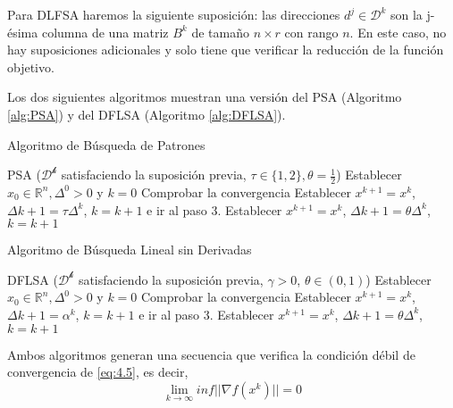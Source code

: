 Para DLFSA haremos la siguiente suposición: las direcciones $d^j\in\mathcal{D}^k$  son la j-ésima columna de una matriz $B^k$ de tamaño $n\times r$ con rango $n$. 
En este caso, no hay suposiciones adicionales y solo tiene que verificar la reducción de la función objetivo. 

Los dos siguientes algoritmos muestran una versión del PSA (Algoritmo \ref{alg:PSA}) y del DFLSA (Algoritmo \ref{alg:DFLSA}).

\begin{algorithm}[H]
\caption{Algoritmo de Búsqueda de Patrones}\label{alg:PSA}
\begin{algorithmic}[1]
\Procedure \textsc{PSA} ($\mathcal{D^k}$ satisfaciendo la suposición previa, $\tau\in\{1,2\}, \theta=\frac{1}{2}$)
\State Establecer $x_0\in\mathbb{R}^n, \Delta^0>0$ y $k=0$
\State Comprobar la convergencia
	\State Establecer $x^{k+1} = x^k$, $\Delta k+1 = \tau\Delta^k$, $k=k+1$ e ir al paso 3.
\Else
	\State Establecer $x^{k+1} = x^k$, $\Delta k+1=\theta\Delta^k$, $k = k+1$ 
\EndIf
\EndProcedure
\end{algorithmic}
\end{algorithm}

\begin{algorithm}[H]
\caption{Algoritmo de Búsqueda Lineal sin Derivadas}\label{alg:DFLSA}
\begin{algorithmic}[1]
\Procedure \textsc{DFLSA} ($\mathcal{D^k}$ satisfaciendo la suposición previa, $\gamma >0$, $\theta\in(0,1)$)
\State Establecer $x_0\in\mathbb{R}^n, \Delta^0>0$ y $k=0$
\State Comprobar la convergencia
	\State Establecer $x^{k+1} = x^k$, $\Delta k+1 = \alpha^k$, $k=k+1$ e ir al paso 3.
\Else
	\State Establecer $x^{k+1} = x^k$, $\Delta k+1=\theta\Delta^k$, $k = k+1$ 
\EndIf
\EndProcedure
\end{algorithmic}
\end{algorithm}

Ambos algoritmos generan una secuencia que verifica la condición débil de convergencia de \ref{eq:4.5}, es decir,
\begin{equation*}
\lim_{k\xrightarrow{}{}\infty} inf||\nabla f(x^k)|| = 0
\end{equation*}

